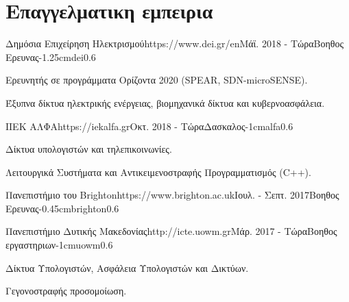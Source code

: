 \documentclass{mycv}
\begin{document}
	\section{Επαγγελματικη εμπειρια}
		\begin{EntryDatedLogo}{Δημόσια Επιχείρηση Ηλεκτρισμού}{https://www.dei.gr/en}{Μάϊ. 2018 - Τώρα}{Βοηθος Ερευνας}{-1.25cm}{dei}{0.6}
		\begin{Itemize}
			\item Ερευνητής σε προγράμματα Ορίζοντα 2020 (SPEAR, SDN-microSENSE).
			\item Έξυπνα δίκτυα ηλεκτρικής ενέργειας, βιομηχανικά δίκτυα και κυβερνοασφάλεια.
		\end{Itemize}
	\end{EntryDatedLogo}
	
	\vspace*{0.5cm}
	
	\begin{EntryDatedLogo}{ΙΙΕΚ ΑΛΦΑ}{https://iekalfa.gr}{Οκτ. 2018 - Τώρα}{Δασκαλος}{-1cm}{alfa}{0.6}
		\begin{Itemize}
			\item Δίκτυα υπολογιστών και τηλεπικοινωνίες.
			\item Λειτουργικά Συστήματα και Αντικειμενοστραφής Προγραμματισμός (C++).
		\end{Itemize}
	\end{EntryDatedLogo}

	\vspace*{0.5cm}
		
	\begin{EntryDatedLogo}{Πανεπιστήμιο του Brighton}{https://www.brighton.ac.uk}{Ιουλ. - Σεπτ. 2017}{Βοηθος Ερευνας}{-0.45cm}{brighton}{0.6}
	\end{EntryDatedLogo}

	\vspace*{0.5cm}	

	\begin{EntryDatedLogo}{Πανεπιστήμιο Δυτικής Μακεδονίας}{http://icte.uowm.gr}{Μάρ. 2017 - Τώρα}{Βοηθος εργαστηριων}{-1cm}{uowm}{0.6}
	\begin{Itemize}
		\item Δίκτυα Υπολογιστών, Ασφάλεια Υπολογιστών και Δικτύων.
		\item Γεγονοστραφής προσομοίωση.
	\end{Itemize}
	\end{EntryDatedLogo}
\end{document}
